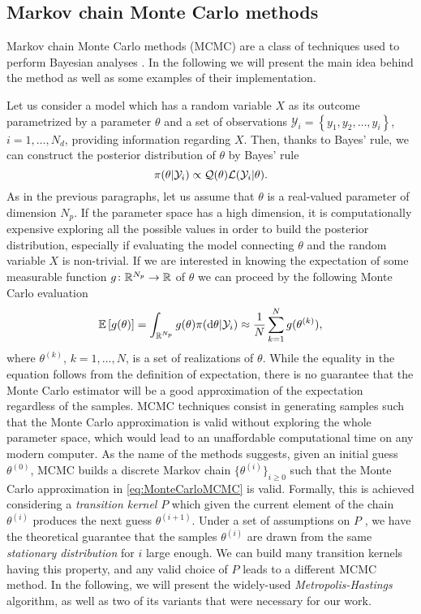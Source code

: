 \subsection{Markov chain Monte Carlo methods}

Markov chain Monte Carlo methods (MCMC) are a class of techniques used to perform Bayesian analyses \cite{Gil05, KaS05}. In the following we will present the main idea behind the method as well as some examples of their implementation. 

Let us consider a model which has a random variable $X$ as its outcome parametrized by a parameter $\theta$ and a set of observations $\mathcal{Y}_i = \left\{y_1, y_2, \ldots, y_i\right\}$, $i = 1, \ldots, N_d$, providing information regarding $X$. Then, thanks to Bayes' rule, we can construct the posterior distribution of $\theta$ by Bayes' rule
\begin{equation}
	\pi(\theta|\mathcal{Y}_i) \propto \mathcal{Q}(\theta) \mathcal{L}(\mathcal{Y}_i|\theta).
\end{equation}
As in the previous paragraphs, let us assume that $\theta$ is a real-valued parameter of dimension $N_p$. If the parameter space has a high dimension, it is computationally expensive exploring all the possible values in order to build the posterior distribution, especially if evaluating the model connecting $\theta$ and the random variable $X$ is non-trivial. If we are interested in knowing the expectation of some measurable function $g\colon \mathbb{R}^{N_p} \to \mathbb{R}$ of $\theta$ we can proceed by the following Monte Carlo evaluation
\begin{equation}\label{eq:MonteCarloMCMC}
	 \mathbb{E}\left[g(\theta)\right]= \int_{\mathbb{R}^{N_p}} g(\theta)\pi(\dd\theta|\mathcal{Y}_i) \approx \frac{1}{N}\sum_{k = 1}^{N} g(\theta^{(k)}),
\end{equation}
where $\theta^{(k)}$, $k = 1, \ldots, N$, is a set of realizations of $\theta$. While the equality in the equation follows from the definition of expectation, there is no guarantee that the Monte Carlo estimator will be a good approximation of the expectation regardless of the samples. MCMC techniques consist in generating samples such that the Monte Carlo approximation is valid without exploring the whole parameter space,  which would lead to an unaffordable computational time on any modern computer. As the name of the methods suggests, given an initial guess $\theta^{(0)}$, MCMC builds a discrete Markov chain $\{\theta^{(i)}\}_{i\geq 0}$ such that the Monte Carlo approximation in \eqref{eq:MonteCarloMCMC} is valid. Formally, this is achieved considering a \textit{transition kernel} $P$ which given the current element of the chain $\theta^{(i)}$ produces the next guess $\theta^{(i+1)}$. Under a set of assumptions on $P$ \cite{KaS05}, we have the theoretical guarantee that the samples $\theta^{(i)}$ are drawn from the same \textit{stationary distribution} for $i$ large enough. We can build many transition kernels having this property, and any valid choice of $P$ leads to a different MCMC method. In the following, we will present the widely-used \textit{Metropolis-Hastings} algorithm, as well as two of its variants that were necessary for our work.

